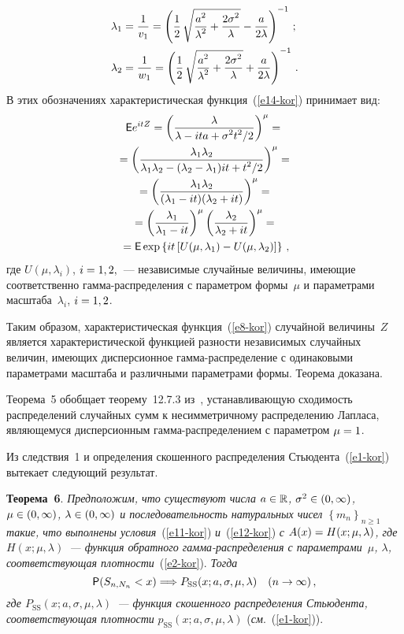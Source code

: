 \begin{multicols}{2}
\begin{align*}
\lambda_1 &= \displaystyle\frac{\displaystyle 1\mathstrut}{\displaystyle v_{1}\mathstrut}  = \left(\displaystyle\frac{\displaystyle 1\mathstrut}{\displaystyle 2\mathstrut}\,\sqrt{\displaystyle\frac{\displaystyle a^{2}\mathstrut}{\displaystyle \lambda^{2}\mathstrut}+\displaystyle\frac{\displaystyle 2\sigma^{2}\mathstrut}{\displaystyle \lambda\mathstrut}} -\displaystyle\frac{\displaystyle a\mathstrut}{\displaystyle 2\lambda\mathstrut}\right)^{-1}\,;
\\
\lambda_2 &= \displaystyle\frac{\displaystyle 1\mathstrut}{\displaystyle w _{1}\mathstrut}  =
\left(\displaystyle\frac{\displaystyle 1\mathstrut}{\displaystyle 2\mathstrut}\,\sqrt{\displaystyle\frac{\displaystyle a^{2}\mathstrut}{\displaystyle \lambda^{2}\mathstrut}+\displaystyle\frac{\displaystyle 2\sigma^{2}\mathstrut}{\displaystyle \lambda\mathstrut}} +\displaystyle\frac{\displaystyle a\mathstrut}{\displaystyle 2\lambda\mathstrut}\right)^{-1}\,.
\end{align*}
В этих обозначениях характеристическая функция~(\ref{e14-kor}) принимает вид:
\begin{multline*}
{\sf E}e^{itZ}=\left (\displaystyle\frac{\displaystyle \lambda\mathstrut}{\displaystyle \lambda - ita  +
\sigma^{2}t^{2}/2\mathstrut}\right )^{\mu} = {}\\
{}=\left(
\displaystyle\frac{\displaystyle \lambda_1\lambda_2\mathstrut}{\displaystyle \lambda_1\lambda_2 -(\lambda_2 -
\lambda_1)it +t^{2}/2\mathstrut}\right )^{\mu} =
{}\\
{}
=\left(
\displaystyle\frac{\displaystyle \lambda_1\lambda_2\mathstrut}{\displaystyle (\lambda_1-it)(\lambda_2+it)\mathstrut}\right)^{\mu} ={}\\
{}=
 \left (\displaystyle\frac{\displaystyle \lambda_1\mathstrut}{\displaystyle \lambda_1-it\mathstrut}\right )^{\mu} \left( 
\displaystyle\frac{\displaystyle \lambda_2\mathstrut}{\displaystyle \lambda_2 + it\mathstrut}\right )^{\mu} = {}\\
{}=
{\sf E}\exp\left\{it\left[U(\mu, \lambda_1) - U(\mu,
\lambda_2)\right]\right\}\,,
\end{multline*}
где $U(\mu,\lambda_i)$, $i\hm=1,2,$~--- независимые случайные
величины, имеющие соответственно гам\-ма-рас\-пре\-де\-ле\-ния с параметром
формы~$\mu$ и параметрами масштаба~$\lambda_i$, $i\hm=1,2$.

Таким образом, характеристическая функция~(\ref{e8-kor}) случайной величины~$Z$ 
является характеристической функцией разности независимых\linebreak
случайных величин, имеющих дисперсионное гам\-ма-рас\-пре\-де\-ле\-ние с
одинаковыми параметрами масштаба и различными параметрами формы.
Теорема доказана.

\smallskip

Теорема~5 обобщает теорему~12.7.3 из~\cite{KorolevBeningShorgin2011}, 
устанавливающую сходимость распределений случайных сумм к несимметричному распределению\linebreak
Лапласа, являющемуся дисперсионным гам\-ма-рас\-пре\-де\-ле\-ни\-ем с
параметром $\mu\hm=1$.

Из следствия~1 и определения скошенного распределения Стьюдента~(\ref{e1-kor}) 
вытекает следующий результат.


\smallskip

\noindent
\textbf{Теорема~6}. \textit{Предположим, что существуют числа $a  \hm\in
\mathbb{R}$, $\sigma^{2} \hm\in (0, \infty )$, $\mu\hm\in(0,\infty)$,
$\lambda \hm\in (0, \infty )$ и последовательность натуральных чисел
$\left\{m_n \right\}_{n \geqslant 1}$ такие, что выполнены условия}~(\ref{e11-kor}) 
\textit{и}~(\ref{e12-kor}) \textit{с $A(x)\hm=H(x;\mu,\lambda)$, где $H(x;\mu,\lambda)$~---
функция обратного гам\-ма-рас\-пре\-де\-ле\-ния с параметрами~$\mu$,
$\lambda$, соответствующая плот\-ности}~(\ref{e2-kor}). \textit{Тогда}
$$
{\sf P}(S_{n, N_{n}}<x)\Longrightarrow
P_{\mathrm{SS}}(x;a,\sigma,\mu,\lambda) \quad  (n\rightarrow \infty)\,,
$$
\textit{где $P_{\mathrm{SS}}(x;a,\sigma,\mu,\lambda)$~--- функция скошенного
распределения Стьюдента, соответствующая плот\-ности}
$p_{\mathrm{SS}}(x;a,\sigma,\mu,\lambda)$ (\textit{см}.~(\ref{e1-kor})).


\end{multicols}
